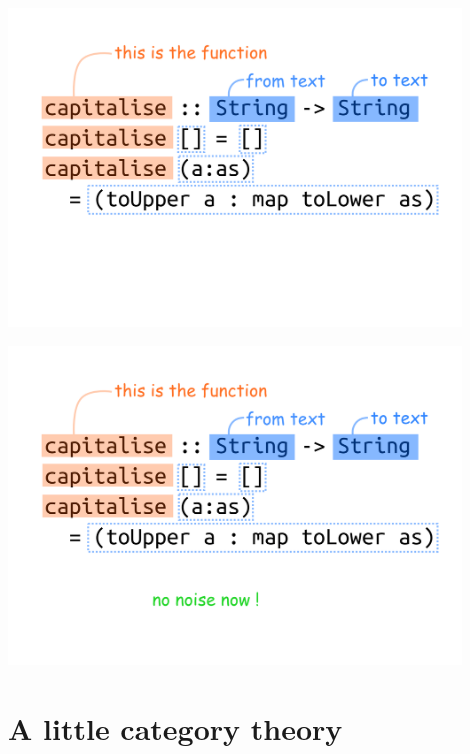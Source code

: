\documentclass[xcolor={table}]{beamer}
\begin{document}
\begin{frame}{}{}

    \centering
    \includegraphics[width=0.9\textwidth]{images/haskell-code-04.png}

\end{frame}

\begin{frame}{}{}

    \centering
    \includegraphics[width=0.9\textwidth]{images/haskell-code-05.png}

\end{frame}


\section{A little category theory}

\begin{frame}{}{}


\end{frame}
\end{document}

